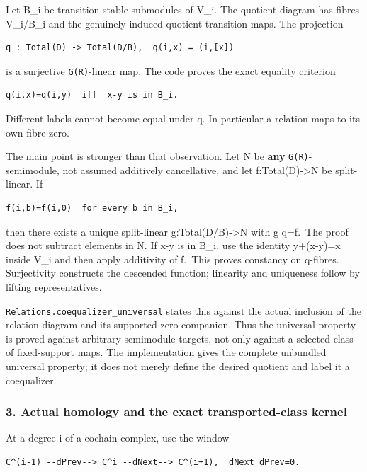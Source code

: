 Let B\_i be transition-stable submodules of V\_i. The quotient diagram has fibres V\_i/B\_i and the
genuinely induced quotient transition maps. The projection

\begin{verbatim}
q : Total(D) -> Total(D/B),  q(i,x) = (i,[x])
\end{verbatim}

is a surjective \nolinkurl{G(R)}-linear map. The code proves the exact equality criterion

\begin{verbatim}
q(i,x)=q(i,y)  iff  x-y is in B_i.
\end{verbatim}

Different labels cannot become equal under q. In particular a relation maps to its own fibre zero.

The main point is stronger than that observation. Let N be \textbf{any} \nolinkurl{G(R)}-semimodule,
not assumed additively cancellative, and let f:Total(D)-\textgreater N be split-linear. If

\begin{verbatim}
f(i,b)=f(i,0)  for every b in B_i,
\end{verbatim}

then there exists a unique split-linear g:Total(D/B)-\textgreater N with g q=f.~The proof does not
subtract elements in N. If x-y is in B\_i, use the identity y+(x-y)=x inside V\_i and then apply
additivity of f.~This proves constancy on q-fibres. Surjectivity constructs the descended function;
linearity and uniqueness follow by lifting representatives.

\nolinkurl{Relations.coequalizer_universal} states this against the actual inclusion of the relation
diagram and its supported-zero companion. Thus the universal property is proved against arbitrary
semimodule targets, not only against a selected class of fixed-support maps. The implementation
gives the complete unbundled universal property; it does not merely define the desired quotient and
label it a coequalizer.

\subsubsection{3. Actual homology and the exact transported-class
kernel}\label{derived_main:actual-homology-and-the-exact-transported-class-kernel}

At a degree i of a cochain complex, use the window

\begin{verbatim}
C^(i-1) --dPrev--> C^i --dNext--> C^(i+1),  dNext dPrev=0.
\end{verbatim}

